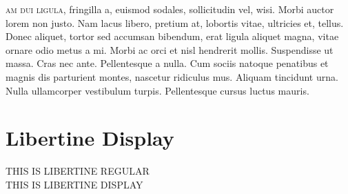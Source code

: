 \documentclass{article}
\begin{document}
\lettrine[lines=3,nindent=0pt]{}{am dui ligula}, fringilla a, euismod sodales, sollicitudin vel, wisi. Morbi auctor lorem
non justo. Nam lacus libero, pretium at, lobortis vitae, ultricies et, tellus. Donec aliquet,
tortor sed accumsan bibendum, erat ligula aliquet magna, vitae ornare odio metus a mi.
Morbi ac orci et nisl hendrerit mollis. Suspendisse ut massa. Cras nec ante. Pellentesque a
nulla. Cum sociis natoque penatibus et magnis dis parturient montes, nascetur ridiculus
mus. Aliquam tincidunt urna. Nulla ullamcorper vestibulum turpis. Pellentesque cursus
luctus mauris.

\clearpage
\section{Libertine Display}

\begin{center}\Huge
THIS IS LIBERTINE REGULAR\\
{\libertineDisplay THIS IS LIBERTINE DISPLAY}
\end{center}
\end{document}
